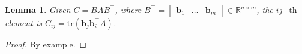 \documentclass[a4paper]{article}
\newtheorem{lem}{Lemma}
\begin{document}
\begin{lem}\label{lem:trblock}
Given $C = BAB^\top$, where $B^\top=\begin{bmatrix}\mathbf{b}_1&\dots&\mathbf{b}_m\end{bmatrix}\in\mathbb{R}^{n\times m}$, the $ij\mathrm{-th}$ element is $C_{ij} = \mathrm{tr}(\mathbf{b}_j\mathbf{b}_i^\top A)$.
\end{lem}
\begin{proof}
By example.

\end{proof}
\end{document}
